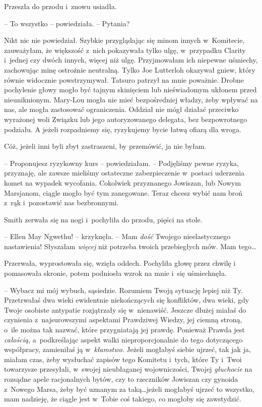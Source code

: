 \documentclass[oneside,polish,11pt,sfheadings]{mwbk}
\begin{document}
Przeszła do przodu i~znowu usiadła. 

-- To wszystko -- powiedziała. -- Pytania?

Nikt nic nie powiedział. Szybkie przyglądając się minom innych w~Komitecie, zauważyłam, że większość z~nich pokazywała tylko ulgę, w~przypadku Clarity i~jednej czy dwóch innych, więcej niż ulgę.
Przyjmowałam ich niepewne uśmiechy, zachowując minę ostrożnie neutralną.
Tylko Joe Lutterloh okazywał gniew, który równie widocznie
powstrzymywał. Tatsuro patrzył na mnie poważnie. Drobne pochylenie głowy
mogło być tajnym skinięciem lub nieświadomym ukłonem przed
nieuniknionym. Mary-Lou mogła nie mieć bezpośredniej władzy, żeby
wpływać na nas, ale mogła zastosować ograniczenia. Oddział nie mógł
działać przeciwko wyrażonej woli Związku lub jego autoryzowanego
delegata, bez bezpowrotnego podziału. A jeżeli rozpadniemy się,
ryzykujemy bycie łatwą ofiarą dla wroga.

Cóż, jeżeli inni byli zbyt zastraszeni, by przemówić, ja nie byłam.

-- Proponujesz ryzykowny kurs -- powiedziałam. -- Podjęliśmy pewne ryzyka,
przyznaję, ale zawsze mieliśmy ostateczne zabezpieczenie w~postaci
uderzenia komet na wypadek wycofania. Cokolwiek przyznanego Jowiszan,
lub Nowym Marsjanom, ciągle mogło być tym zanegowane. Teraz chcesz wybić
nam broń z~rąk i~pozostawić nas bezbronnymi.

Smith zerwała się na nogi i~pochyliła do przodu, pięści na stole.

-- Ellen May Ngwethu! -- krzyknęła. -- Mam \textit{dość} Twojego
nieelastycznego nastawienia! Słyszałam \textit{więcej} niż potrzeba twoich
przebiegłych mów. Mam tego\ldots 

Przerwała, wyprostowała się, wzięła oddech. Pochyliła głowę przez chwilę
i pomasowała skronie, potem podniosła wzrok na mnie i~się uśmiechnęła.

-- Wybacz mi mój wybuch, sąsiedzie. Rozumiem Twoją sytuację lepiej niż
Ty. Przetrwałaś dwa wieki ewidentnie niekończących się konfliktów, dwa
wieki, gdy Twoje osobiste antypatie rozjątrzały się w~nienawiść. Jeszcze
dłużej miałaś do czynienia z~najsurowszymi aspektami Prawdziwej Wiedzy,
jej ciemną stroną, o~ile można tak nazwać, które przygniatają jej
prawdę. Ponieważ Prawda jest \textit{całością}, a~podkreślając aspekt
walki nieproporcjonalnie do tego dotyczącego współpracy, zamieniłaś ją w~\textit{kłamstwo}. Jeżeli mogłabyś siebie ujrzeć, tak jak ja, miałam czas,
żeby wysłuchać zapisów tego Komitetu i~tych, które Ty i~Twoi towarzysze
przesyłali, w~swojej nieubłaganej wojowniczości, Twojej \textit{głuchocie}
na rozsądne apele racjonalnych bytów, czy to rzeczników Jowiszan czy
gynoida z~Nowego Marsa, żeby być uznanym za taką\ldots  jeżeli mogłabyś
ujrzeć to wszystko, mam nadzieję, że ciągle jest w~Tobie coś takiego, co
mogłoby się zawstydzić.
\end{document}
